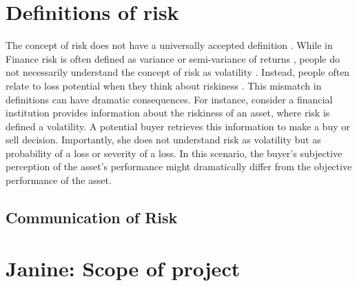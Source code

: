 \documentclass[a4paper,man, natbib,floatsintext]{apa6} %
\begin{document}
\section{Definitions of risk}
The concept of risk does not have a universally accepted definition \citep{Slovic1987}. While in Finance risk is often defined as variance or semi-variance of returns \citep{Markowitz1952, Markowitz1991, Markowitz1959}, people do not necessarily understand the concept of risk as volatility \citep{Mohr2010a}. Instead, people often relate to loss potential when they think about riskiness \citep{Duxbury2004, Sachse2012}. This mismatch in definitions can have dramatic consequences. For instance, consider a financial institution provides information about the riskiness of an asset, where risk is defined a volatility. A potential buyer retrieves this information to make a buy or sell decision. Importantly, she does not understand risk as volatility but as probability of a loss or severity of a loss. In this scenario, the buyer's subjective perception of the asset's performance might dramatically differ from the objective performance of the asset. %


\subsection{Communication of Risk}




\section{Janine: Scope of project}
\end{document}
